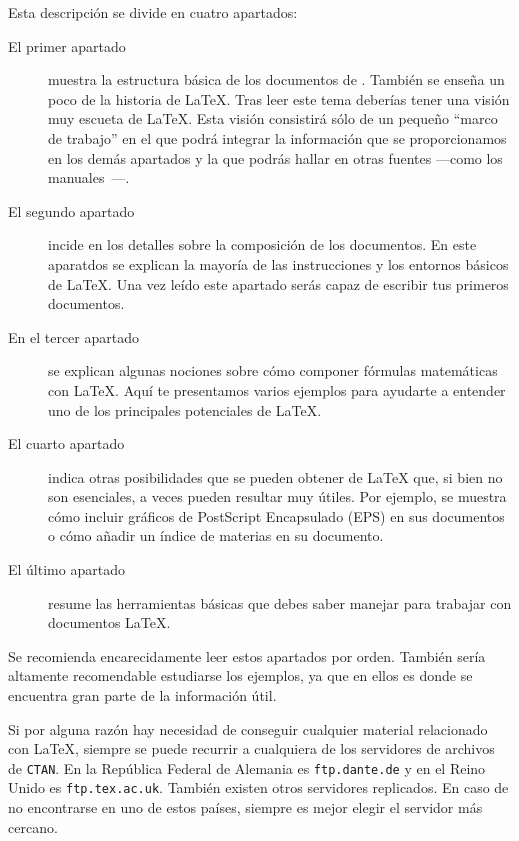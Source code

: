 \bigskip
\noindent Esta descripción se divide en cuatro apartados:
\begin{description}

\item[El  primer  apartado]  muestra   la  estructura  básica  de  los
documentos de  \LaTeXe. También se  enseña un  poco de la  historia de
\LaTeX. Tras leer  este tema deberías tener una visión  muy escueta de
\LaTeX. Esta visión consistirá sólo de un pequeño ``marco de trabajo''
en el que  podrá integrar la información que se  proporcionamos en los
demás apartados  y la que podrás  hallar en otras fuentes  ---como los
manuales~\cite{llmanual,companion}---.

\item[El segundo apartado] incide en los detalles sobre la composición
de los  documentos. En este  aparatdos se  explican la mayoría  de las
instrucciones y  los entornos  básicos de \LaTeX.  Una vez  leído este
apartado serás capaz de escribir tus primeros documentos.

\item[En  el  tercer  apartado]  se explican  algunas  nociones  sobre
cómo  componer fórmulas  matemáticas con  \LaTeX. Aquí  te presentamos
varios  ejemplos  para ayudarte  a  entender  uno de  los  principales
potenciales de \LaTeX.

\item[El  cuarto apartado]  indica otras  posibilidades que  se pueden
obtener de  \LaTeX{} que, si  bien no  son esenciales, a  veces pueden
resultar muy útiles. Por ejemplo,  se muestra cómo incluir gráficos de
PostScript Encapsulado (EPS) en sus documentos o cómo añadir un índice
de materias en su documento.

\item[El último  apartado] resume  las herramientas básicas  que debes
saber manejar para trabajar con documentos \LaTeX.

\end{description}

\noindent  Se  recomienda  encarecidamente leer  estos  apartados  por
orden. También  sería altamente recomendable estudiarse  los ejemplos,
ya que  en ellos es  donde se encuentra  gran parte de  la información
útil.

\noindent Si  por alguna  razón hay  necesidad de  conseguir cualquier
material  relacionado   con  \LaTeX,  siempre  se   puede  recurrir  a
cualquiera de  los servidores  de archivos  de \texttt{CTAN}\@.  En la
República Federal de  Alemania es \texttt{ftp.dante.de} y  en el Reino
Unido  es  \texttt{ftp.tex.ac.uk}.  También existen  otros  servidores
replicados. En caso de no encontrarse  en uno de estos países, siempre
es mejor elegir el servidor más cercano.

